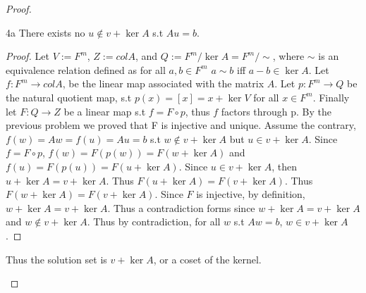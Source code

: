 \documentclass{article}
\newcommand{\rarr}[0]{\rightarrow}
\begin{document}
\begin{proof}
\begin{enumerate}
        \begin{claim}{4a}
            There exists no $u \not \in v + \ker A$ s.t $Au = b$.
        \end{claim}
        \begin{proof}
            Let $V:= F^m$, $Z:= col A$, and $Q:= F^m/\ker A = F^m / \sim$, where $\sim$ is an equivalence relation defined as for all $a, b \in F^m$ $a \sim b$ iff $a - b \in \ker A$. Let $f: F^m \rarr col A$, be the linear map associated with the matrix $A$. Let $p: F^m \rarr Q$ be the natural quotient map, s.t $p(x) = [x] = x + \ker V$ for all $x \in F^m$. Finally let $F: Q \rarr Z$ be a linear map s.t $f = F \circ p$, thus $f$ factors through p. By the previous problem we proved that F is injective and unique. Assume the contrary, $f(w) = Aw = f(u) = Au = b$ s.t $w \not \in v + \ker A$ but $u \in v + \ker A$. Since $f = F \circ p$, $f(w) = F(p(w)) = F(w + \ker A)$ and $f(u) = F(p(u)) = F(u + \ker A)$. Since $u \in v + \ker A$, then $u + \ker A = v + \ker A$. Thus $F(u + \ker A) = F(v + \ker A)$. Thus $F(w + \ker A) = F(v + \ker A)$. Since $F$ is injective, by definition, $w + \ker A = v + \ker A$. Thus a contradiction forms since $w + \ker A = v + \ker A$ and $w \not \in v + \ker A$. Thus by contradiction, for all $w$ s.t $Aw = b$, $w \in v + \ker A$.
        \end{proof}

        Thus the solution set is $v + \ker A$, or a coset of the kernel.
    \end{enumerate}
\end{proof}

\bigskip
\end{document}
